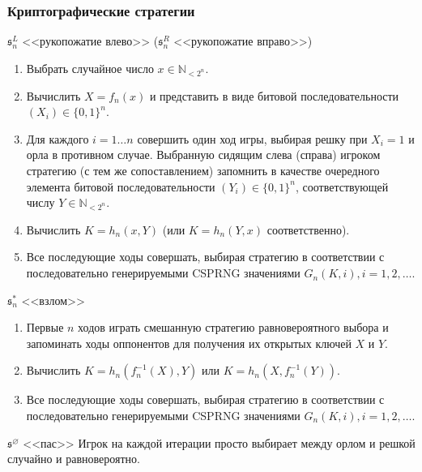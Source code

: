 \begin{frame}[allowframebreaks]
	\frametitle{Криптографические стратегии}
	\begin{block}{$\mathfrak{s}^L_n$ <<рукопожатие влево>> ($\mathfrak{s}^R_n$ <<рукопожатие вправо>>)}
		\begin{enumerate}
			\item Выбрать случайное число $x \in \mathbb{N}_{<2^n}$.
			\item Вычислить $X = f_n(x)$ и представить в виде битовой последовательности $(X_i) \in \{0, 1\}^n$.
			\item Для каждого $i = 1 \ldots n$ совершить один ход игры, выбирая решку при $X_i = 1$ и орла в противном случае. Выбранную сидящим слева (справа) игроком стратегию (с тем же сопоставлением) запомнить в качестве очередного элемента битовой последовательности $(Y_i) \in \{0, 1\}^n$, соответствующей числу $Y \in \mathbb{N}_{<2^n}$.
			\item Вычислить $K = h_n(x, Y)$ (или $K = h_n(Y, x)$ соответственно).
			\item Все последующие ходы совершать, выбирая стратегию в соответствии с последовательно генерируемыми CSPRNG значениями $G_n(K, i), i = 1, 2, \ldots$.
		\end{enumerate}
	\end{block}
	
	\framebreak

	\begin{block}{$\mathfrak{s}^*_n$ <<взлом>>}
		\begin{enumerate}
			\item Первые $n$ ходов играть смешанную стратегию равновероятного выбора и запоминать ходы оппонентов для получения их открытых ключей $X$ и $Y$.
			\item Вычислить $K = h_n(f_n^{-1}(X), Y)$ или $K = h_n(X, f_n^{-1}(Y))$.
			\item Все последующие ходы совершать, выбирая стратегию в соответствии с последовательно генерируемыми CSPRNG значениями $G_n(K, i), i = 1, 2, \ldots$.
		\end{enumerate}
	\end{block}
	\begin{block}{$\mathfrak{s}^{\varnothing}$ <<пас>>}
		Игрок на каждой итерации просто выбирает между орлом и решкой случайно и равновероятно.
	\end{block}
\end{frame}

